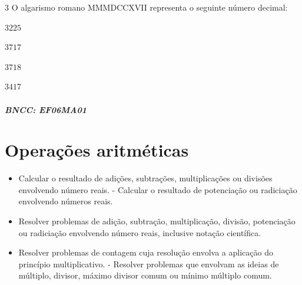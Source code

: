 
\num{3}  O algarismo romano MMMDCCXVII representa o seguinte número decimal:

\begin{escolha}
\item $3225$
\item $3717$
\item $3718$
\item $3417$
\end{escolha}

\paragraph{BNCC: EF06MA01 }



\chapter{Operações aritméticas}

\begin{itemize}
\item Calcular o resultado de adições, subtrações,
multiplicações ou divisões envolvendo número reais. - Calcular o
resultado de potenciação ou radiciação envolvendo números reais.
\item Resolver problemas de adição, subtração, multiplicação, divisão,
  potenciação ou radiciação envolvendo número reais, inclusive notação
  científica.
\item Resolver problemas de contagem cuja resolução envolva a aplicação do
  princípio multiplicativo. - Resolver problemas que envolvam as ideias
  de múltiplo, divisor, máximo divisor comum ou mínimo múltiplo comum.
\end{itemize}

